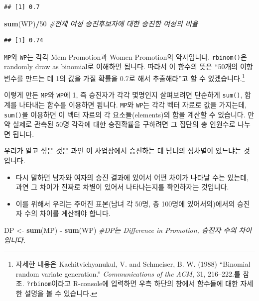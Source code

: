 \documentclass[]{book}
\newenvironment{Shaded}{\begin{snugshade}}{\end{snugshade}}
\newcommand{\CommentTok}[1]{\textcolor[rgb]{0.56,0.35,0.01}{\textit{#1}}}
\newcommand{\DecValTok}[1]{\textcolor[rgb]{0.00,0.00,0.81}{#1}}
\newcommand{\KeywordTok}[1]{\textcolor[rgb]{0.13,0.29,0.53}{\textbf{#1}}}
\newcommand{\NormalTok}[1]{#1}
\newcommand{\OperatorTok}[1]{\textcolor[rgb]{0.81,0.36,0.00}{\textbf{#1}}}
\newcommand{\StringTok}[1]{\textcolor[rgb]{0.31,0.60,0.02}{#1}}
\providecommand{\tightlist}{%
  \setlength{\itemsep}{0pt}\setlength{\parskip}{0pt}}
\let\rmarkdownfootnote\footnote%
\def\footnote{\protect\rmarkdownfootnote}
\begin{document}
\begin{itemize}
\begin{verbatim}
## [1] 0.7
\end{verbatim}

\begin{Shaded}
\begin{Highlighting}[]
\KeywordTok{sum}\NormalTok{(WP)}\OperatorTok{/}\DecValTok{50} \CommentTok{#전체 여성 승진후보자에 대한 승진한 여성의 비율}
\end{Highlighting}
\end{Shaded}

\begin{verbatim}
## [1] 0.74
\end{verbatim}
\end{itemize}

\texttt{MP}와 \texttt{WP}는 각각 Mem Promotion과 Women Promotion의 약자입니다. \texttt{rbinom()}은 randomly draw as binomial로 이해하면 됩니다. 따라서 이 함수의 뜻은 ``50개의 이항변수를 만드는 데 1의 값을 가질 확률을 0.7로 해서 추출해라''고 할 수 있겠습니다.\footnote{자세한 내용은 Kachitvichyanukul, V. and Schmeiser, B. W. (1988) ``Binomial random variate generation.'' \emph{Communications of the ACM}, 31, 216--222.를 참조. \texttt{?rbinom}이라고 R-console에 입력하면 우측 하단의 창에서 함수들에 대한 자세한 설명을 볼 수 있습니다.}

이렇게 만든 \texttt{MP}와 \texttt{WP}에 1, 즉 승진자가 각각 몇명인지 살펴보려면 단순하게 \texttt{sum()}, 합계를 나타내는 함수를 이용하면 됩니다. \texttt{MP}와 \texttt{WP}는 각각 벡터 자료로 값을 가지는데, \texttt{sum()}을 이용하면 이 벡터 자료의 각 요소들(elements)의 합을 계산할 수 있습니다. 만약 실제로 관측된 50명 각각에 대한 승진확률을 구하려면 그 집단의 총 인원수로 나누면 됩니다.

우리가 알고 싶은 것은 과연 이 사업장에서 승진하는 데 남녀의 성차별이 있느냐는 것입니다.

\begin{itemize}
\tightlist
\item
  다시 말하면 남자와 여자의 승진 결과에 있어서 어떤 차이가 나타날 수는 있는데, 과연 그 차이가 진짜로 차별이 있어서 나타나는지를 확인하자는 것입니다.
\item
  이를 위해서 우리는 주어진 표본(남녀 각 50명, 총 100명에 있어서의)에서의 승진자 수의 차이를 계산해야 합니다.
\end{itemize}

\begin{Shaded}
\begin{Highlighting}[]
\NormalTok{DP <-}\StringTok{ }\KeywordTok{sum}\NormalTok{(MP) }\OperatorTok{-}\StringTok{ }\KeywordTok{sum}\NormalTok{(WP) }\CommentTok{#DP는 Difference in Promotion, 승진자 수의 차이입니다.}
\end{Highlighting}
\end{Shaded}
\end{document}
